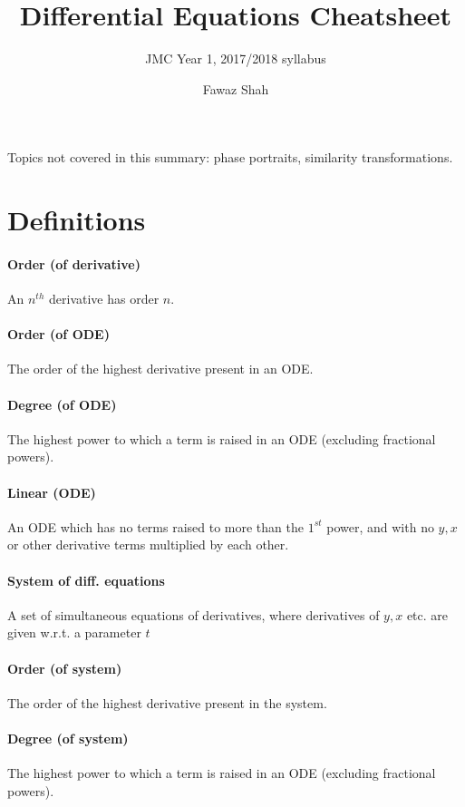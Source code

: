 \documentclass{scrartcl}
\title{Differential Equations Cheatsheet}
\subtitle{JMC Year 1, 2017/2018 syllabus}
\date{}
\author{Fawaz Shah}
\begin{document}
\large
\maketitle
\noindent Topics not covered in this summary: phase portraits, similarity transformations.
\tableofcontents
\newpage
\section{Definitions}

\paragraph{Order (of derivative)}
An $ n^{th} $ derivative has order $ n $.

\paragraph{Order (of ODE)}
The order of the highest derivative present in an ODE.

\paragraph{Degree (of ODE)}
The highest power to which a term is raised in an ODE (excluding fractional powers).

\paragraph*{Linear (ODE)}
An ODE which has no terms raised to more than the $ 1^{st} $ power, and with no $ y, x $ or other derivative terms multiplied by each other.

\paragraph{System of diff. equations}
A set of simultaneous equations of derivatives, where derivatives of $ y, x $ etc. are given w.r.t. a parameter $ t $

\paragraph{Order (of system)}
The order of the highest derivative present in the system.

\paragraph{Degree (of system)}
The highest power to which a term is raised in an ODE (excluding fractional powers).
\end{document}

